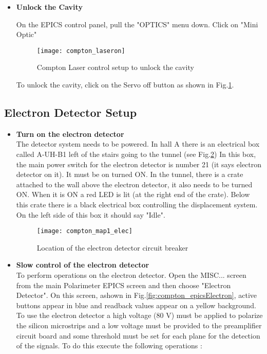{\begin{itemize}
\item {\bf Unlock the Cavity}

On the EPICS control panel, pull the "OPTICS" menu down. Click on "Mini Optic" 
\begin{figure}[htp]
    \begin{center}    
        \texttt{[image: compton\_laseron]}
    \end{center}
    \caption[compton:laser control ]{Compton Laser control setup to unlock the cavity}
    \label{fig:compton_laseron}
\end{figure}


To unlock the cavity, click on the Servo off button as shown in Fig.\ref{fig:compton_laseron}.
\end{itemize}
    
\newpage
\subsection{Electron Detector Setup}
\begin{itemize}
\item {\bf Turn on the electron detector}\\
        The detector system needs to be powered. In hall A there is an
        electrical box called A-UH-B1 left of the stairs going to the tunnel 
	(see Fig.\ref{fig:compton_map1_elec})
        In this box, the main power switch for the electron detector is number 21 (it says electron
        detector on it). It must be on turned ON. In the tunnel,
        there is a crate attached to the wall above the electron detector, it also needs to be turned ON.
        When it is ON a red LED is lit (at the right end of the crate). Below this crate there is a black electrical
        box controlling the displacement system. On the left side of this box it should say "Idle".
\begin{figure}[htp]
    \begin{center}
        \texttt{[image: compton\_map1\_elec]}
    \end{center}
    \caption[compton:electron detector circuit breaker]{Location of the electron detector circuit breaker}
    \label{fig:compton_map1_elec}
\end{figure}

\item {\bf Slow control of the electron detector }\\
To perform operations on the electron detector. Open the MISC... screen from the main Polarimeter EPICS screen
and then choose "Electron Detector". On this screen, ashown in Fig.\ref{fig:compton_epicsElectron},
 active buttons appear in blue
and readback values appear on a yellow background. 
To use the electron detector a high voltage
(80 V) must be applied to polarize the silicon
microstrips and a low voltage must be provided to the preamplifier
circuit board and some threshold must be set for each plane for
the detection of the signals. To do this execute the following operations :


\end{itemize}}
